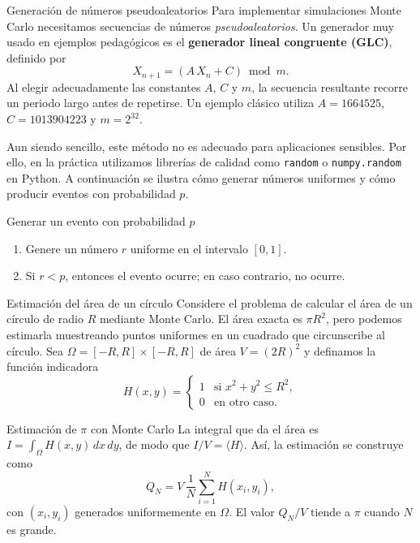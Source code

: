 \begin{frame}{Generación de números pseudoaleatorios}
\justifying
Para implementar simulaciones Monte Carlo necesitamos secuencias de números
\emph{pseudoaleatorios}. Un generador muy usado en ejemplos pedagógicos es el
\textbf{generador lineal congruente (GLC)}, definido por
\begin{equation*}
X_{n+1} = (A\,X_n + C) \bmod m.
\end{equation*}
Al elegir adecuadamente las constantes $A$, $C$ y $m$, la secuencia resultante
recorre un periodo largo antes de repetirse. Un ejemplo clásico utiliza
$A=1664525$, $C=1013904223$ y $m=2^{32}$.

Aun siendo sencillo, este método no es adecuado para aplicaciones sensibles.
Por ello, en la práctica utilizamos librerías de calidad como \texttt{random}
o \texttt{numpy.random} en Python. A continuación se ilustra cómo generar
números uniformes y cómo producir eventos con probabilidad $p$.

\begin{block}{Generar un evento con probabilidad $p$}
\begin{enumerate}
    \item Genere un número $r$ uniforme en el intervalo $[0,1]$.
    \item Si $r<p$, entonces el evento ocurre; en caso contrario, no ocurre.
\end{enumerate}
\end{block}
\end{frame}

\begin{frame}{Estimación del área de un círculo}
\normalsize
\justifying
Considere el problema de calcular el área de un círculo de radio $R$ mediante
Monte Carlo. El área exacta es $\pi R^2$, pero podemos estimarla muestreando
puntos uniformes en un cuadrado que circunscribe al círculo. Sea
$\Omega=[-R,R]\times[-R,R]$ de área $V=(2R)^2$ y definamos la función
indicadora
\begin{equation*}
H(x,y)=
\begin{cases}
1 & \text{si } x^2+y^2 \le R^2,\\
0 & \text{en otro caso.}
\end{cases}
\end{equation*}
\end{frame}

\begin{frame}{Estimación de $\pi$ con Monte Carlo}
\normalsize
\justifying
La integral que da el área es $I=\int_{\Omega} H(x,y)\,dx\,dy$, de modo que
$I/V=\langle H\rangle$. Así, la estimación se construye como
\begin{equation*}
Q_N = V\,\frac{1}{N}\sum_{i=1}^N H(x_i,y_i),
\end{equation*}
con $(x_i,y_i)$ generados uniformemente en $\Omega$. El valor $Q_N/V$ tiende a
$\pi$ cuando $N$ es grande.
\end{frame}

